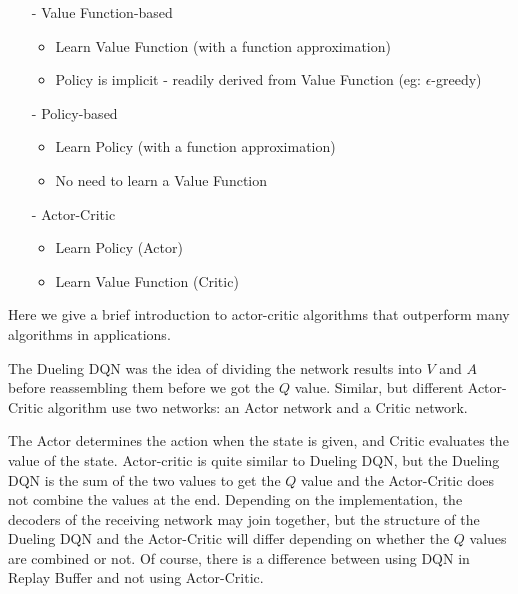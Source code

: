\begin{itemize}
\setlength{\parskip}{0pt}
\item[-] Value Function-based
    \begin{itemize}
    \item
    Learn Value Function (with a function approximation)
    \item
    Policy is implicit - readily derived from Value Function (eg: $\epsilon$-greedy)
    \end{itemize}

\item[-] Policy-based
    \begin{itemize}
    \item
    Learn Policy (with a function approximation)
    \item
    No need to learn a Value Function
    \end{itemize}

\item[-] Actor-Critic
    \begin{itemize}
    \item
    Learn Policy (Actor)
    \item
    Learn Value Function (Critic)
    \end{itemize}

\end{itemize}

Here we give a brief introduction to actor-critic algorithms that 
outperform many algorithms in applications.

The Dueling DQN was the idea of ​​dividing the network results into $V$ and 
$A$ before reassembling them before we got the $Q$ value. Similar, but 
different Actor-Critic algorithm use two networks: an Actor network and 
a Critic network.

The Actor determines the action when the state is given, and Critic 
evaluates the value of the state. Actor-critic is quite similar to 
Dueling DQN, but the Dueling DQN is the sum of the two values to get the 
$Q$ value and the Actor-Critic does not combine the values at the end. 
Depending on the implementation, the decoders of the receiving network 
may join together, but the structure of the Dueling DQN and the 
Actor-Critic will differ depending on whether the $Q$ values are combined 
or not. Of course, there is a difference between using DQN in Replay 
Buffer and not using Actor-Critic.

